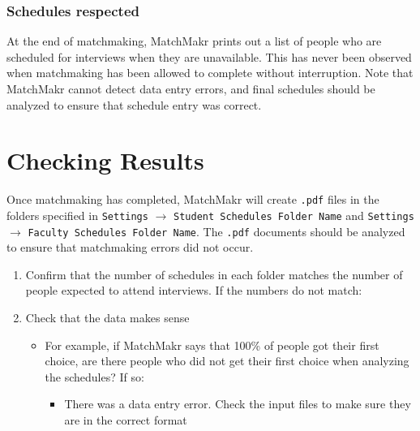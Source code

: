 \subsubsection{Schedules respected}
At the end of matchmaking, MatchMakr prints out a list of people who are scheduled for interviews when they are unavailable.  This has never been observed when matchmaking has been allowed to complete without interruption.  Note that MatchMakr cannot detect data entry errors, and final schedules should be analyzed to ensure that schedule entry was correct.


\section{Checking Results}

Once matchmaking has completed, MatchMakr will create \texttt{.pdf} files in the folders specified in \texttt{Settings} $\rightarrow$ \texttt{Student Schedules Folder Name} and \texttt{Settings} $\rightarrow$ \texttt{Faculty Schedules Folder Name}.  The \texttt{.pdf} documents should be analyzed to ensure that matchmaking errors did not occur.

\begin{enumerate}
	\item Confirm that the number of schedules in each folder matches the number of people expected to attend interviews.  If the numbers do not match:
	\item Check that the data makes sense
		\begin{itemize}
			\item For example, if MatchMakr says that 100\% of people got their first choice, are there people who did not get their first choice when analyzing the schedules?  If so:
				\begin{itemize}
					\item There was a data entry error.  Check the input files to make sure they are in the correct format
			\end{itemize}
		\end{itemize}
\end{enumerate}

